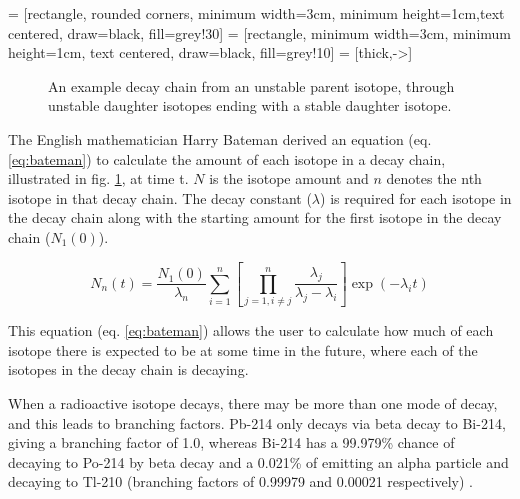  = [rectangle, rounded corners, minimum width=3cm, minimum height=1cm,text centered, draw=black, fill=grey!30]
 = [rectangle, minimum width=3cm, minimum height=1cm, text centered, draw=black, fill=grey!10]
 = [thick,->]

\begin{figure}[!h]
\centering
{}
\caption{An example decay chain from an unstable parent isotope, through unstable daughter isotopes ending with a stable daughter isotope.}
\label{fig:decaychain}
\end{figure}

The English mathematician Harry Bateman derived an equation (eq. \ref{eq:bateman}\cite{bateman}\cite{batemanequation}) to calculate the amount of each isotope in a decay chain, illustrated in fig. \ref{fig:decaychain}, at time t.  $N$ is the isotope amount and $n$ denotes the nth isotope in that decay chain.  The decay constant ($\lambda$) is required for each isotope in the decay chain along with the starting amount for the first isotope in the decay chain ($N_1(0)$).

\begin{equation}
N_{n}(t) = \frac{N_1(0)}{\lambda_n} \sum_{i=1}^{n} \left[ \prod_{j=1, i\ne j}^{n} \frac{\lambda_j}{\lambda_j - \lambda_i}\right] \exp(-\lambda_i t) 
\label{eq:bateman}
\end{equation}

This equation (eq. \ref{eq:bateman}) allows the user to calculate how much of each isotope there is expected to be at some time in the future, where each of the isotopes in the decay chain is decaying.

When a radioactive isotope decays, there may be more than one mode of decay, and this leads to branching factors.  Pb-214 only decays via beta decay to Bi-214, giving a branching factor of 1.0, whereas Bi-214 has a 99.979\% chance of decaying to Po-214 by beta decay and a 0.021\% of emitting an alpha particle and decaying to Tl-210 (branching factors of 0.99979 and 0.00021 respectively) \cite{jeff311}.

